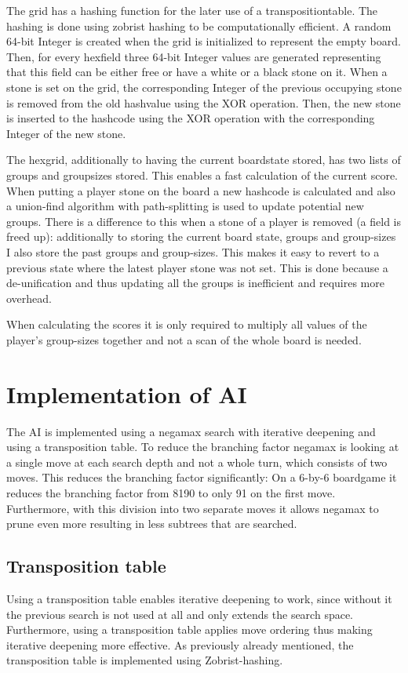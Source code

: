 \documentclass[a4paper]{article}
\begin{document}
The grid has a hashing function for the later use of a transpositiontable. The hashing is done using zobrist hashing \cite{zobrist1970new} to be computationally efficient. A random 64-bit Integer is created when the grid is initialized to represent the empty board. Then, for every hexfield three 64-bit Integer values are generated representing that this field can be either free or have a white or a black stone on it. When a stone is set on the grid, the corresponding Integer of the previous occupying stone is removed from the old hashvalue using the XOR operation. Then, the new stone is inserted to the hashcode using the XOR operation with the corresponding Integer of the new stone.

The hexgrid, additionally to having the current boardstate stored, has two lists of groups and groupsizes stored. This enables a fast calculation of the current score. When putting a player stone on the board a new hashcode is calculated and also a union-find algorithm \cite{galler1964improved} with path-splitting is used to update potential new groups. There is a difference to this when a stone of a player is removed (a field is freed up): additionally to storing the current board state, groups and group-sizes I also store the past groups and group-sizes. This makes it easy to revert to a previous state where the latest player stone was not set. This is done because a de-unification and thus updating all the groups is inefficient and requires more overhead.

When calculating the scores it is only required to multiply all values of the player's group-sizes together and not a scan of the whole board is needed.


\section{Implementation of AI}
The AI is implemented using a negamax search with iterative deepening and using a transposition table. To reduce the branching factor negamax is looking at a single move at each search depth and not a whole turn, which consists of two moves. This reduces the branching factor significantly: On a 6-by-6 boardgame it reduces the branching factor from 8190 to only 91 on the first move. Furthermore, with this division into two separate moves it allows negamax to prune even more resulting in less subtrees that are searched.

\subsection{Transposition table}
Using a transposition table enables iterative deepening to work, since without it the previous search is not used at all and only extends the search space. Furthermore, using a transposition table applies move ordering thus making iterative deepening more effective. As previously already mentioned, the transposition table is implemented using Zobrist-hashing.
\end{document}
